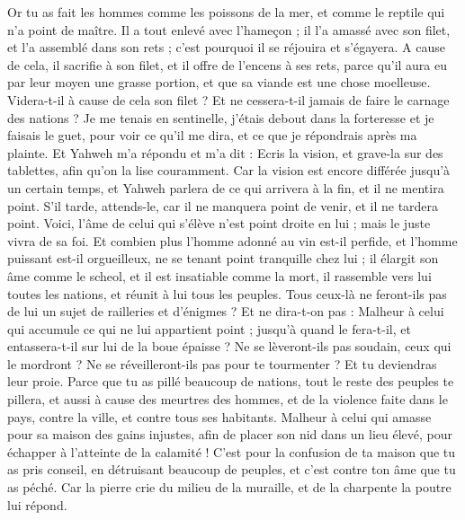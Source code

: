 \begin{multicols}{2}
Or tu as fait les hommes comme les poissons de la mer, et comme le reptile qui n'a point de maître.
Il a tout enlevé avec l'hameçon ; il l'a amassé avec son filet, et l'a assemblé dans son rets ; c'est pourquoi il se réjouira et s'égayera.
A cause de cela, il sacrifie à son filet, et il offre de l’encens à ses rets, parce qu'il aura eu par leur moyen une grasse portion, et que sa viande est une chose moelleuse.
Videra-t-il à cause de cela son filet ? Et ne cessera-t-il jamais de faire le carnage des nations ?
\VerseOne{}Je me tenais en sentinelle, j'étais debout dans la forteresse et je faisais le guet, pour voir ce qu’il me dira, et ce que je répondrais après ma plainte.
Et Yahweh m'a répondu et m'a dit : Ecris la vision, et grave-la sur des tablettes, afin qu'on la lise couramment.
Car la vision est encore différée jusqu'à un certain temps, et Yahweh parlera de ce qui arrivera à la fin, et il ne mentira point. S'il tarde, attends-le, car il ne manquera point de venir, et il ne tardera point.
Voici, l'âme de celui qui s'élève n'est point droite en lui ; mais le juste vivra de sa foi.
Et combien plus l'homme adonné au vin est-il perfide, et l'homme puissant est-il orgueilleux, ne se tenant point tranquille chez lui ; il élargit son âme comme le scheol, et il est insatiable comme la mort, il rassemble vers lui toutes les nations, et réunit à lui tous les peuples.
Tous ceux-là ne feront-ils pas de lui un sujet de railleries et d’énigmes ? Et ne dira-t-on pas : Malheur à celui qui accumule ce qui ne lui appartient point ; jusqu'à quand le fera-t-il, et entassera-t-il sur lui de la boue épaisse ?
Ne se lèveront-ils pas soudain, ceux qui le mordront ? Ne se réveilleront-ils pas pour te tourmenter ? Et tu deviendras leur proie.
Parce que tu as pillé beaucoup de nations, tout le reste des peuples te pillera, et aussi à cause des meurtres des hommes, et de la violence faite dans le pays, contre la ville, et contre tous ses habitants.
Malheur à celui qui amasse pour sa maison des gains injustes, afin de placer son nid dans un lieu élevé, pour échapper à l’atteinte de la calamité !
C’est pour la confusion de ta maison que tu as pris conseil, en détruisant beaucoup de peuples, et c’est contre ton âme que tu as péché.
Car la pierre crie du milieu de la muraille, et de la charpente la poutre lui répond.

\end{multicols}
